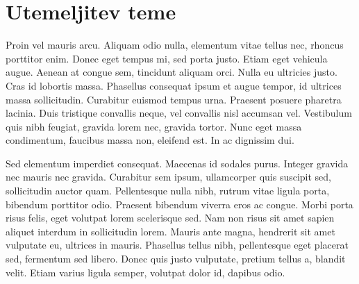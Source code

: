 \documentclass[a4paper,11pt]{article}
\begin{document}
\section*{Utemeljitev teme}
Proin vel mauris arcu. Aliquam odio nulla, elementum vitae tellus nec, rhoncus porttitor enim. Donec eget tempus mi, sed porta justo. Etiam eget vehicula augue. Aenean at congue sem, tincidunt aliquam orci. Nulla eu ultricies justo. Cras id lobortis massa. Phasellus consequat ipsum et augue tempor, id ultrices massa sollicitudin. Curabitur euismod tempus urna. Praesent posuere pharetra lacinia. Duis tristique convallis neque, vel convallis nisl accumsan vel. Vestibulum quis nibh feugiat, gravida lorem nec, gravida tortor. Nunc eget massa condimentum, faucibus massa non, eleifend est. In ac dignissim dui.

Sed elementum imperdiet consequat. Maecenas id sodales purus. Integer gravida nec mauris nec gravida. Curabitur sem ipsum, ullamcorper quis suscipit sed, sollicitudin auctor quam. Pellentesque nulla nibh, rutrum vitae ligula porta, bibendum porttitor odio. Praesent bibendum viverra eros ac congue. Morbi porta risus felis, eget volutpat lorem scelerisque sed. Nam non risus sit amet sapien aliquet interdum in sollicitudin lorem. Mauris ante magna, hendrerit sit amet vulputate eu, ultrices in mauris. Phasellus tellus nibh, pellentesque eget placerat sed, fermentum sed libero. Donec quis justo vulputate, pretium tellus a, blandit velit. Etiam varius ligula semper, volutpat dolor id, dapibus odio.
\end{document}
